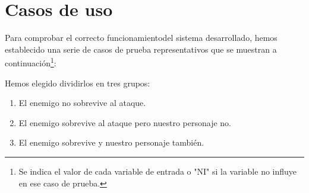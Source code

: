 \section{Casos de uso}

Para comprobar el correcto funcionamientodel sistema desarrollado, hemos establecido una serie de casos de prueba representativos que se muestran a continuación\footnote{Se indica el valor de cada variable de entrada o "NI" si la variable no influye en ese caso de prueba.}:






Hemos elegido dividirlos en tres grupos:
\begin{enumerate}
	\item El enemigo no sobrevive al ataque.
	\item El enemigo sobrevive al ataque pero nuestro personaje no.
	\item El enemigo sobrevive y nuestro personaje también.
\end{enumerate}

